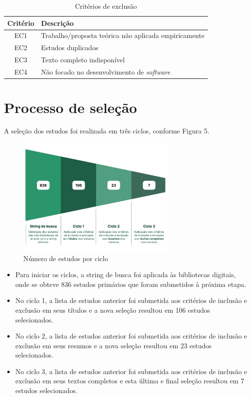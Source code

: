 \documentclass[
	12pt,
	openright,
	twoside,
	a4paper,
	english,
	brazil
	]{abntex2}
\begin{document}
\begin{table}[H]
  \centering
  \caption{Critérios de exclusão}
  \begin{tabular}{|c|l|}
  \hline
  \textbf{Critério} & \textbf{Descrição} \\ \hline
  EC1 & Trabalho/proposta teórica não aplicada empiricamente \\ \hline
  EC2 & Estudos duplicados \\ \hline
  EC3 & Texto completo indisponível \\ \hline
  EC4 & Não focado no desenvolvimento de \textit{software} \\ \hline
  \end{tabular}
\end{table}


\section{Processo de seleção}

A seleção dos estudos foi realizada em três ciclos, conforme Figura 5.

\begin{figure}[H]
	\centering
  \caption{\label{numero-estudos-ciclo}Número de estudos por ciclo}
  \includegraphics[width=0.7\textwidth]{numero-estudos-ciclo}
\end{figure}

\begin{itemize}
  \item Para iniciar os ciclos, a string de busca foi aplicada às bibliotecas digitais, onde se obteve 836 estudos primários que foram submetidos à próxima etapa.
  \item No ciclo 1, a lista de estudos anterior foi submetida aos critérios de inclusão e exclusão em seus títulos e a nova seleção resultou em 106 estudos selecionados.
  \item No ciclo 2, a lista de estudos anterior foi submetida aos critérios de inclusão e exclusão em seus resumos e a nova seleção resultou em 23 estudos selecionados.
  \item No ciclo 3, a lista de estudos anterior foi submetida aos critérios de inclusão e exclusão em seus textos completos e esta última e final seleção resultou em 7 estudos selecionados.
\end{itemize}
\end{document}
